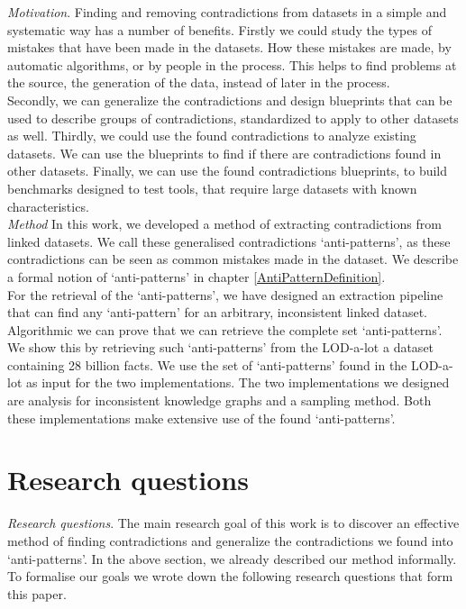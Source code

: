 \documentclass[11pt,letterpaper ,oneside ]{book}
\begin{document}
	\textit{Motivation}. Finding and removing contradictions from datasets in a simple and systematic way has a number of benefits. Firstly we could study the types of mistakes that have been made in the datasets. How these mistakes are made, by automatic algorithms, or by people in the process. This helps to find problems at the source, the generation of the data, instead of later in the process. \\
	Secondly, we can generalize the contradictions and design blueprints that can be used to describe groups of contradictions, standardized to apply to other datasets as well. Thirdly, we could use the found contradictions to analyze existing datasets. We can use the blueprints to find if there are contradictions found in other datasets. 
	Finally, we can use the found contradictions blueprints, to build benchmarks designed to test tools, that require large datasets with known characteristics.\\
	
	\textit{Method} In this work, we developed a method of extracting contradictions from linked datasets. We call these generalised contradictions `anti-patterns', as these contradictions can be seen as common mistakes made in the dataset. We describe a formal notion of `anti-patterns' in chapter \ref{AntiPatternDefinition}.\\
	
	For the retrieval of the `anti-patterns', we have designed an extraction pipeline that can find any `anti-pattern' for an arbitrary, inconsistent linked dataset. Algorithmic we can prove that we can retrieve the complete set `anti-patterns'. We show this by retrieving such `anti-patterns' from the LOD-a-lot\cite{JavierD:2017} a dataset containing 28 billion facts. We use the set of `anti-patterns' found in the LOD-a-lot as input for the two implementations. The two implementations we designed are analysis for inconsistent knowledge graphs and a sampling method. Both these implementations make extensive use of the found `anti-patterns'. 
	
	\section{Research questions}
	\textit{Research questions}. The main research goal of this work is to discover an effective method of finding contradictions and generalize the contradictions we found into `anti-patterns'. In the above section, we already described our method informally. To formalise our goals we wrote down the following research questions that form this paper.
	
\end{document}
